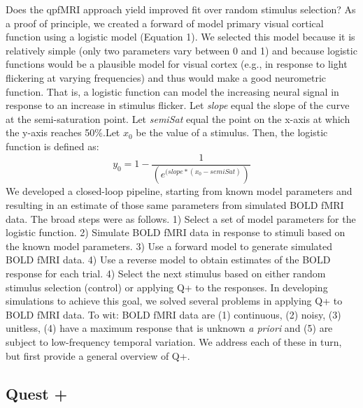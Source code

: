 \documentclass[
  man,floatsintext]{apa6}
\begin{document}
Does the qpfMRI approach yield improved fit over random stimulus selection? As a proof of principle, we created a forward of model primary visual cortical function using a logistic model (Equation 1). We selected this model because it is relatively simple (only two parameters vary between 0 and 1) and because logistic functions would be a plausible model for visual cortex (e.g., in response to light flickering at varying frequencies) and thus would make a good neurometric function. That is, a logistic function can model the increasing neural signal in response to an increase in stimulus flicker. Let \emph{slope} equal the slope of the curve at the semi-saturation point. Let \emph{semiSat} equal the point on the x-axis at which the y-axis reaches 50\%.Let \(x_0\) be the value of a stimulus. Then, the logistic function is defined as:
\begin{equation}
  y_0 = 1-\frac{1}{(e^{(slope*(x_0-semiSat)})}
  \end{equation}
We developed a closed-loop pipeline, starting from known model parameters and resulting in an estimate of those same parameters from simulated BOLD fMRI data. The broad steps were as follows. 1) Select a set of model parameters for the logistic function. 2) Simulate BOLD fMRI data in response to stimuli based on the known model parameters. 3) Use a forward model to generate simulated BOLD fMRI data. 4) Use a reverse model to obtain estimates of the BOLD response for each trial. 4) Select the next stimulus based on either random stimulus selection (control) or applying Q+ to the responses.
In developing simulations to achieve this goal, we solved several problems in applying Q+ to BOLD fMRI data. To wit: BOLD fMRI data are (1) continuous, (2) noisy, (3) unitless, (4) have a maximum response that is unknown \emph{a priori} and (5) are subject to low-frequency temporal variation. We address each of these in turn, but first provide a general overview of Q+.

\hypertarget{quest}{%
\subsection{Quest +}\label{quest}}
\end{document}
